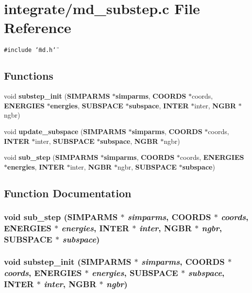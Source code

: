 \section{integrate/md\_\-substep.c File Reference}
\label{md__substep_8c}
{\tt \#include \char`\"{}md.h\char`\"{}}\par
\subsection*{Functions}
\begin{CompactItemize}
\item 
void {\bf substep\_\-init} ({\bf SIMPARMS} $\ast${\bf simparms}, {\bf COORDS} $\ast$coords, {\bf ENERGIES} $\ast${\bf energies}, {\bf SUBSPACE} $\ast${\bf subspace}, {\bf INTER} $\ast$inter, {\bf NGBR} $\ast$ngbr)
\item 
void {\bf update\_\-subspace} ({\bf SIMPARMS} $\ast${\bf simparms}, {\bf COORDS} $\ast$coords, {\bf INTER} $\ast$inter, {\bf SUBSPACE} $\ast${\bf subspace}, {\bf NGBR} $\ast$ngbr)
\item 
void {\bf sub\_\-step} ({\bf SIMPARMS} $\ast${\bf simparms}, {\bf COORDS} $\ast$coords, {\bf ENERGIES} $\ast${\bf energies}, {\bf INTER} $\ast$inter, {\bf NGBR} $\ast$ngbr, {\bf SUBSPACE} $\ast${\bf subspace})
\end{CompactItemize}


\subsection{Function Documentation}
\subsubsection{\setlength{\rightskip}{0pt plus 5cm}void sub\_\-step ({\bf SIMPARMS} $\ast$ {\em simparms}, {\bf COORDS} $\ast$ {\em coords}, {\bf ENERGIES} $\ast$ {\em energies}, {\bf INTER} $\ast$ {\em inter}, {\bf NGBR} $\ast$ {\em ngbr}, {\bf SUBSPACE} $\ast$ {\em subspace})}\label{md__substep_8c_4e073e1cf12420b3b6186551a03f47d4}


\subsubsection{\setlength{\rightskip}{0pt plus 5cm}void substep\_\-init ({\bf SIMPARMS} $\ast$ {\em simparms}, {\bf COORDS} $\ast$ {\em coords}, {\bf ENERGIES} $\ast$ {\em energies}, {\bf SUBSPACE} $\ast$ {\em subspace}, {\bf INTER} $\ast$ {\em inter}, {\bf NGBR} $\ast$ {\em ngbr})}\label{md__substep_8c_1eb48ad532505c15f5cf55e4f2f159fb}


